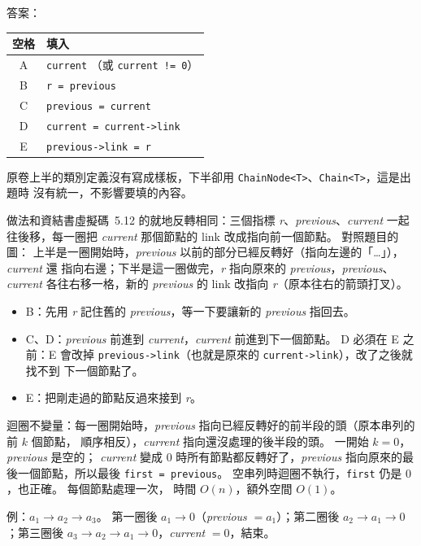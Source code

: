 \begin{pastsoln}
答案：
\begin{center}
\begin{tabular}{cl}
\toprule
空格 & 填入 \\
\midrule
A & \texttt{current} （或 \texttt{current != 0}） \\
B & \texttt{r = previous} \\
C & \texttt{previous = current} \\
D & \texttt{current = current->link} \\
E & \texttt{previous->link = r} \\
\bottomrule
\end{tabular}
\end{center}

原卷上半的類別定義沒有寫成樣板，下半卻用 \texttt{ChainNode<T>}、\texttt{Chain<T>}，這是出題時
沒有統一，不影響要填的內容。

做法和資結書虛擬碼~5.12 的就地反轉相同：三個指標 \textit{r}、\textit{previous}、\textit{current}
一起往後移，每一圈把 \textit{current} 那個節點的 link 改成指向前一個節點。 對照題目的圖：
上半是一圈開始時，\textit{previous} 以前的部分已經反轉好（指向左邊的「…」），\textit{current} 還
指向右邊；下半是這一圈做完，\textit{r} 指向原來的 \textit{previous}，\textit{previous}、
\textit{current} 各往右移一格，新的 \textit{previous} 的 link 改指向 \textit{r}（原本往右的箭頭打叉）。

\begin{itemize}
\item B：先用 \textit{r} 記住舊的 \textit{previous}，等一下要讓新的 \textit{previous} 指回去。
\item C、D：\textit{previous} 前進到 \textit{current}，\textit{current} 前進到下一個節點。 D 必須在
E 之前：E 會改掉 \texttt{previous->link}（也就是原來的 \texttt{current->link}），改了之後就找不到
下一個節點了。
\item E：把剛走過的節點反過來接到 \textit{r}。
\end{itemize}

迴圈不變量：每一圈開始時，\textit{previous} 指向已經反轉好的前半段的頭（原本串列的前 $k$ 個節點，
順序相反），\textit{current} 指向還沒處理的後半段的頭。 一開始 $k = 0$，\textit{previous} 是空的；
\textit{current} 變成 $0$ 時所有節點都反轉好了，\textit{previous} 指向原來的最後一個節點，所以最後
\texttt{first = previous}。 空串列時迴圈不執行，\texttt{first} 仍是 $0$，也正確。 每個節點處理一次，
時間 $O(n)$，額外空間 $O(1)$。

例：$a_1 \to a_2 \to a_3$。 第一圈後 $a_1 \to 0$（\textit{previous} $= a_1$）；第二圈後
$a_2 \to a_1 \to 0$；第三圈後 $a_3 \to a_2 \to a_1 \to 0$，\textit{current} $= 0$，結束。
\end{pastsoln}

